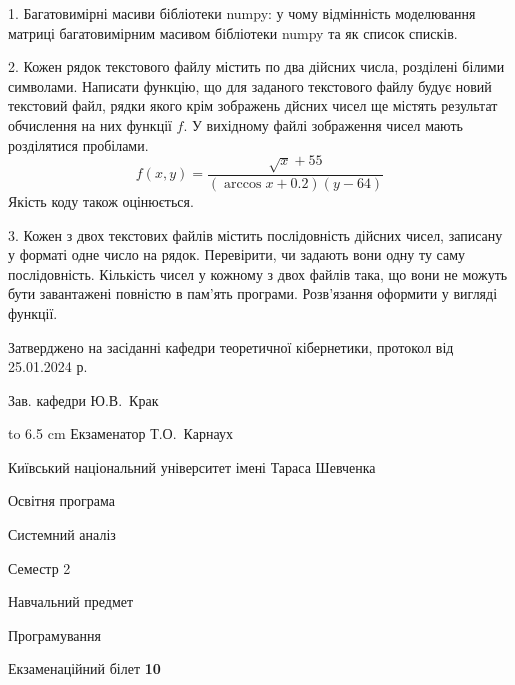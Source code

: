 \documentclass[12pt, ukrainian]{article}
\begin{document}
{%
1. Багатовимірні масиви бібліотеки numpy: у чому відмінність моделювання матриці багатовимірним масивом бібліотеки numpy та як список списків.%
\par
\vspace{2mm}

2. Кожен рядок текстового файлу містить по два дійсних числа, розділені білими символами.
Написати функцію, що для заданого текстового файлу будує новий текстовий файл, рядки якого крім зображень дйсних чисел ще містять результат обчислення на них функції $f$. У вихідному файлі зображення чисел мають розділятися пробілами. 
$$f(x, y) =\frac{\sqrt x + 55}{(\arccos x + 0.2) (y - 64)}$$ 
Якість коду також оцінюється.

\par
\vspace{2mm}

3. Кожен з двох текстових файлів містить послідовність дійсних чисел, записану у форматі одне число на рядок.  Перевірити, чи задають вони одну ту саму послідовність. Кількість чисел у кожному з двох файлів така, що вони не можуть бути завантажені повністю в пам'ять програми. Розв'язання оформити у вигляді функції.

}
{\smallskip\smallskip \begin {scriptsize} Затверджено на засіданні кафедри теоретичної кібернетики, протокол   від   25.01.2024 р.\par\smallskip\smallskip\smallskip\smallskip
{\parbox {6.5 cm} {Зав. кафедри \dotfill Ю.В.~Крак}}\hspace {0.7cm} {\hbox to 6.5 cm { Екзаменатор \dotfill Т.О.~Карнаух}} \end{scriptsize}}
\vspace{0.9cm}
{{\begin {scriptsize}\par
{ \center  Київський національний університет імені Тараса Шевченка \par}
{\parbox {5 cm}{Освітня програма \hfill}{\parbox {7 cm}{Системний аналіз\hfill}}\parbox {6 cm}{\hfill Семестр 2}}\par
{\parbox {5 cm} {Навчальний предмет \hfill}\parbox {7 cm}{Програмування \hfill}\parbox {6cm}{\hfill}\par}\vspace{-15pt} \end{scriptsize}}{\center Екзаменаційний білет \No \textbf { 10 }\par}}
\end{document}

